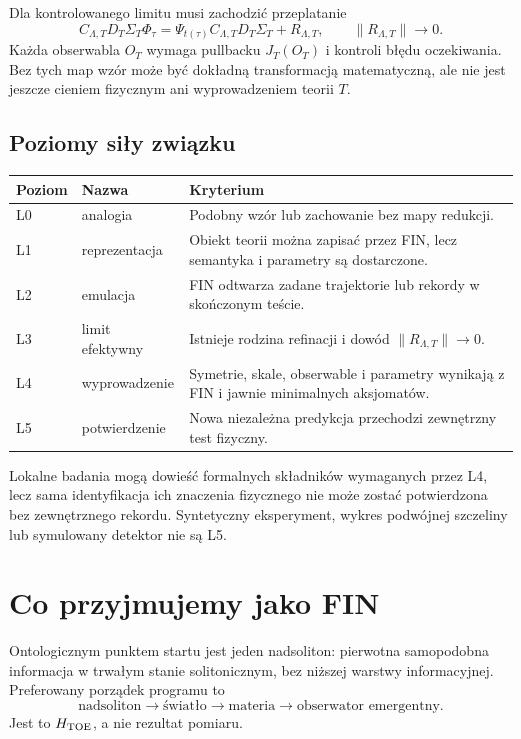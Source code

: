 \documentclass[11pt,a4paper]{article}
\begin{document}
Dla kontrolowanego limitu musi zachodzić przeplatanie
\begin{equation}
C_{\Lambda,T}D_T\Sigma_T\Phi_\tau
=\Psi_{t(\tau)}C_{\Lambda,T}D_T\Sigma_T+R_{\Lambda,T},
\qquad \|R_{\Lambda,T}\|\longrightarrow0.          \label{eq:intertwine}
\end{equation}
Każda obserwabla $O_T$ wymaga pullbacku $J_T(O_T)$ i kontroli błędu oczekiwania. Bez tych map wzór może być dokładną transformacją matematyczną, ale nie jest jeszcze cieniem fizycznym ani wyprowadzeniem teorii $T$.

\subsection{Poziomy siły związku}

\begin{center}
\small
\begin{tabularx}{\textwidth}{@{}p{}p{}X@{}}
\toprule
Poziom & Nazwa & Kryterium\\
\midrule
L0 & analogia & Podobny wzór lub zachowanie bez mapy redukcji.\\
L1 & reprezentacja & Obiekt teorii można zapisać przez FIN, lecz semantyka i parametry są dostarczone.\\
L2 & emulacja & FIN odtwarza zadane trajektorie lub rekordy w skończonym teście.\\
L3 & limit efektywny & Istnieje rodzina refinacji i dowód $\|R_{\Lambda,T}\|\to0$.\\
L4 & wyprowadzenie & Symetrie, skale, obserwable i parametry wynikają z FIN i jawnie minimalnych aksjomatów.\\
L5 & potwierdzenie & Nowa niezależna predykcja przechodzi zewnętrzny test fizyczny.\\
\bottomrule
\end{tabularx}
\normalsize
\end{center}

Lokalne badania mogą dowieść formalnych składników wymaganych przez L4, lecz sama identyfikacja ich znaczenia fizycznego nie może zostać potwierdzona bez zewnętrznego rekordu. Syntetyczny eksperyment, wykres podwójnej szczeliny lub symulowany detektor nie są L5.

\section{Co przyjmujemy jako FIN}

Ontologicznym punktem startu jest jeden nadsoliton: pierwotna samopodobna informacja w trwałym stanie solitonicznym, bez niższej warstwy informacyjnej. Preferowany porządek programu to
\[
\text{nadsoliton}\longrightarrow\text{światło}\longrightarrow\text{materia}\longrightarrow\text{obserwator emergentny}.
\]
Jest to $H_{\rm TOE}$, a nie rezultat pomiaru.
\end{document}
